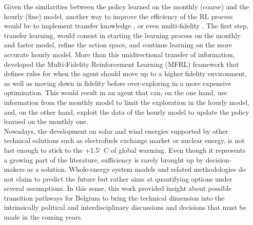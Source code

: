 Given the similarities between the policy learned on the monthly (coarse) and the hourly (fine) model, another way to improve the efficiency of the \gls{RL} process would be to implement transfer knowledge \cite{mann2013directed}, or even multi-fidelity \cite{cutler2014reinforcement}.  The first step, transfer learning, would consist in starting the learning process on the monthly and faster model, refine the action space, and continue learning on the more accurate hourly model.  More than this unidirectional transfer of information, \citet{cutler2014reinforcement} developed the Multi-Fidelity Reinforcement Learning (MFRL) framework that defines rules for when the agent should move up to a higher fidelity environment, as well as moving down in fidelity before over-exploring in a more expensive optimisation.  This would result in an agent that can, on the one hand, use information from the monthly model to limit the exploration in the hourly model, and, on the other hand, exploit the data of the hourly model to update the policy learned on the monthly one.\\

Nowadays, the development on solar and wind energies supported by other technical solutions such as electrofuels exchange market or nuclear energy, is not fast enough to stick to the +1.5$^{\circ}$ C of global warming. Even though it represents a growing part of the literature, sufficiency is rarely brought up by decision-makers as a solution. Whole-energy system models and related methodologies do not claim to predict the future but rather aims at quantifying options under several assumptions. In this sense, this work provided insight about possible transition pathways for Belgium to bring the technical dimension into the intrinsically political and interdisciplinary discussions and decisions that must be made in the coming years.